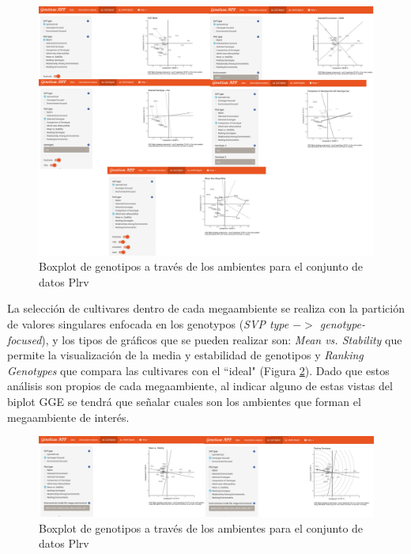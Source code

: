\begin{figure}[H]
	\begin{center}
		\includegraphics[width=16cm]{./Graficos/www/GGE_biplotAPP1.png}
	\end{center}
	\caption{Boxplot de genotipos a través de los ambientes para el conjunto de datos Plrv}
	\label{fig:ggebip1}
\end{figure}

La selección de cultivares dentro de cada megaambiente se realiza con la partición de valores singulares enfocada en los genotypos (\emph{SVP type $->$ genotype-focused}), y los tipos de gráficos que se pueden realizar son: \emph{Mean vs. Stability} que permite la visualización de la media y estabilidad de genotipos y \emph{Ranking Genotypes} que compara las cultivares con el ``ideal" (Figura \ref{fig:ggebip2}). Dado que estos análisis son propios de cada megaambiente, al indicar alguno de estas vistas del biplot GGE se tendrá que señalar cuales son los ambientes que forman el megaambiente de interés. 


\begin{figure}[H]
	\begin{center}
		\includegraphics[width=16cm]{./Graficos/www/GGE_biplotAPP2.png}
	\end{center}
	\caption{Boxplot de genotipos a través de los ambientes para el conjunto de datos Plrv}
	\label{fig:ggebip2}
\end{figure}

